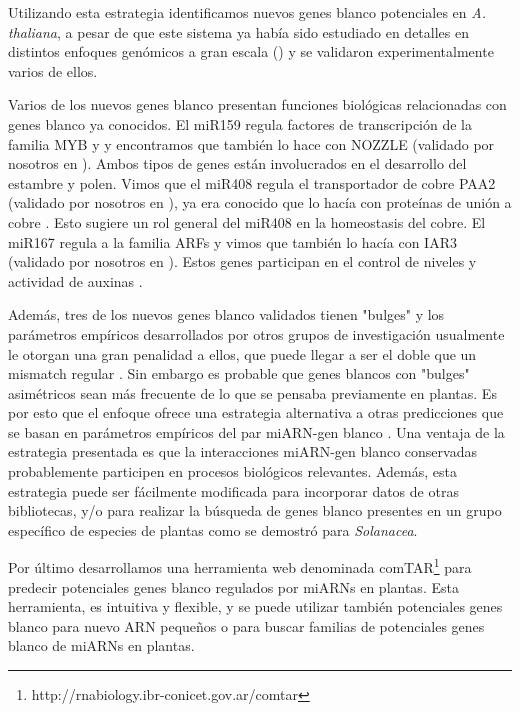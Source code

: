 Utilizando esta estrategia identificamos nuevos genes blanco potenciales en \textit{A. thaliana}, a pesar de que este sistema ya había sido estudiado en detalles en distintos enfoques genómicos a gran escala (\citep{Allen2005207,JonesRhoades2004787,Addo-quaye2009a,German2008,Rajagopalan2006,Schwab2005517}) y se validaron experimentalmente varios de ellos.

Varios de los nuevos genes blanco presentan funciones biológicas relacionadas con genes blanco ya conocidos.
El miR159 regula factores de transcripción de la familia MYB y y encontramos que también lo hace con NOZZLE (validado por nosotros en \citep{Chorostecki05072012}).
Ambos tipos de genes están involucrados en el desarrollo del estambre y polen\citep{Millar2005,Biology1999,Yang1999,pmid17916625}.
Vimos que el miR408 regula el transportador de cobre PAA2 (validado por nosotros en \citep{Chorostecki05072012}), ya era conocido que lo hacía con proteínas de unión a cobre \citep{JonesRhoades2004787,German2008,Schwab2005517,pmid15258262}.
Esto sugiere un rol general del miR408 en la homeostasis del cobre.
El miR167 regula a la familia ARFs \citep{Rhoades2002513,pmid17021043} y vimos que también lo hacía con IAR3 (validado por nosotros en \citep{Chorostecki05072012}).
Estos genes participan en el control de niveles y actividad de auxinas \citep{Davies1999,pmid15491917}.

Además, tres de los nuevos genes blanco validados tienen "bulges" y los parámetros empíricos desarrollados por otros grupos de investigación usualmente le otorgan una gran penalidad a ellos, que puede llegar a ser el doble que un mismatch regular \citep{JonesRhoades2004787}.
Sin embargo es probable que genes blancos con "bulges" asimétricos sean más frecuente de lo que se pensaba previamente en plantas.
Es por esto que el enfoque ofrece una estrategia alternativa a otras predicciones que se basan en parámetros empíricos del par miARN-gen blanco \citep{Allen2005207,JonesRhoades2004787,citeulike:8816489,Fahlgren_chapter}.
Una ventaja de la estrategia presentada es que la interacciones miARN-gen blanco conservadas probablemente participen en procesos biológicos relevantes.
Además, esta estrategia puede ser fácilmente modificada para incorporar datos de otras bibliotecas, y/o para realizar la búsqueda de genes blanco presentes en un grupo específico de especies de plantas como se demostró para \textit{Solanacea}.

Por último desarrollamos una herramienta web denominada comTAR\footnote{http://rnabiology.ibr-conicet.gov.ar/comtar} para predecir potenciales genes blanco regulados por miARNs en plantas.
Esta herramienta, es intuitiva y flexible, y se puede utilizar también potenciales genes blanco para nuevo ARN pequeños o para buscar familias de potenciales genes blanco de miARNs en plantas. 

